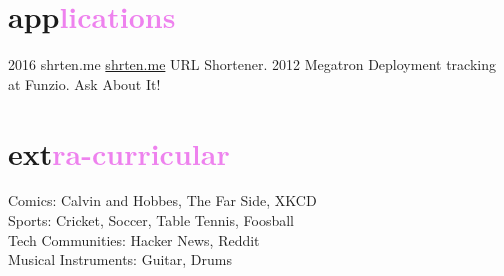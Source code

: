 \documentclass[]{friggeri-cv}
\begin{document}
\section{app\textcolor{violet}{lications}}

\begin{entrylist}
  \entry
    {2016}
    {shrten.me}
    {\href{http://shrten.me}{shrten.me}}
    {URL Shortener.}
  \entry
    {2012}
    {Megatron}
    {}
    {Deployment tracking at Funzio. Ask About It!}
\end{entrylist}

\section{ext\textcolor{violet}{ra-curricular}}
Comics: Calvin and Hobbes, The Far Side, XKCD\\
Sports: Cricket, Soccer, Table Tennis, Foosball\\
Tech Communities: Hacker News, Reddit\\
Musical Instruments: Guitar, Drums
\end{document}
